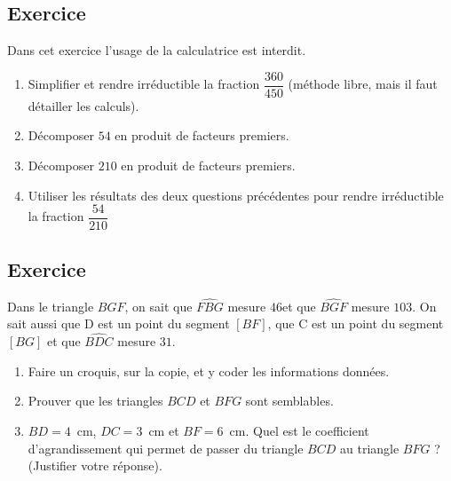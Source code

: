 \documentclass[a4paper,12pt,fleqn]{article}
\newcounter{exo}          				%
\newcommand{\exo}{					%
  	\stepcounter{exo}        			%
  	\subsection*{Exercice \no{}\theexo}}
\begin{document}
\vspace{0.5cm}

\medskip
\begin{minipage}{0.99\linewidth}

\exo

Dans cet exercice l'usage de la calculatrice est interdit.

\begin{enumerate}

\item Simplifier et rendre irréductible la fraction $\dfrac{360}{450}$ (méthode libre, mais il faut détailler les calculs).
\item Décomposer $54$ en produit de facteurs premiers.
\item Décomposer $210$ en produit de facteurs premiers.
\item Utiliser les résultats des deux questions précédentes pour rendre irréductible la fraction $\dfrac{54}{210}$
\end{enumerate}
\end{minipage}

\vspace{0.5cm}

\medskip
\begin{minipage}{0.99\linewidth}

\exo

Dans le triangle $BGF$, on sait que $\widehat{FBG}$ mesure $46$\degre et que $\widehat{BGF}$ mesure $103$\degre. On sait aussi que D est un point du segment $[BF]$, que C est un point du segment $[BG]$ et que $\widehat{BDC}$ mesure $31$\degre.

		\begin{enumerate}
		\item Faire un croquis, sur la copie, et y coder les informations données.
		\item Prouver que les triangles $BCD$ et $BFG$ sont semblables.
		\item $BD= 4$~cm, $DC=3$~cm et $BF=6$~cm. Quel est le coefficient d'agrandissement qui permet de passer du triangle $BCD$ au triangle $BFG$ ? (Justifier votre réponse).
		\end{enumerate}	

\end{minipage}

\vspace{0.5cm}
\medskip
\newpage
\setcounter{exo}{0}

\end{document}
